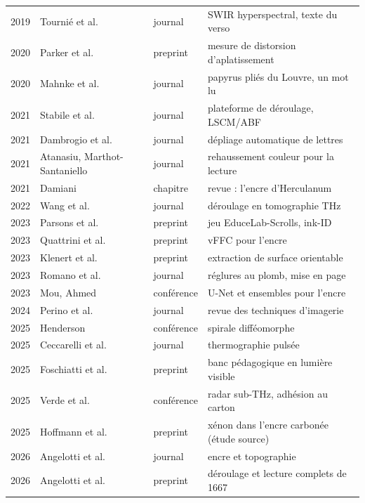 \documentclass[11pt,a4paper]{article}
\begin{document}
\begin{small}
\begin{longtable}{@{}p{1.2cm}p{6.1cm}p{2.3cm}p{5cm}@{}}
2019 & Tournié et al. \cite{tournie2019} & journal & SWIR hyperspectral, texte du verso \\
2020 & Parker et al. \cite{parker2020} & preprint & mesure de distorsion d'aplatissement \\
2020 & Mahnke et al. \cite{mahnke2020} & journal & papyrus pliés du Louvre, un mot lu \\
2021 & Stabile et al. \cite{stabile2021} & journal & plateforme de déroulage, LSCM/ABF \\
2021 & Dambrogio et al. \cite{dambrogio2021} & journal & dépliage automatique de lettres \\
2021 & Atanasiu, Marthot-Santaniello \cite{atanasiu2021} & journal & rehaussement couleur pour la lecture \\
2021 & Damiani \cite{damiani2021} & chapitre & revue : l'encre d'Herculanum \\
2022 & Wang et al. \cite{wang2022thz} & journal & déroulage en tomographie THz \\
2023 & Parsons et al. \cite{parsons2023} & preprint & jeu EduceLab-Scrolls, ink-ID \\
2023 & Quattrini et al. \cite{quattrini2023} & preprint & vFFC pour l'encre \\
2023 & Klenert et al. \cite{klenert2023} & preprint & extraction de surface orientable \\
2023 & Romano et al. \cite{romano2023} & journal & réglures au plomb, mise en page \\
2023 & Mou, Ahmed \cite{mou2023} & conférence & U-Net et ensembles pour l'encre \\
2024 & Perino et al. \cite{perino2024} & journal & revue des techniques d'imagerie \\
2025 & Henderson \cite{henderson2025} & conférence & spirale difféomorphe \\
2025 & Ceccarelli et al. \cite{ceccarelli2025} & journal & thermographie pulsée \\
2025 & Foschiatti et al. \cite{foschiatti2025} & preprint & banc pédagogique en lumière visible \\
2025 & Verde et al. \cite{verde2025} & conférence & radar sub-THz, adhésion au carton \\
2025 & Hoffmann et al. \cite{hoffmann2025} & preprint & xénon dans l'encre carbonée (étude source) \\
2026 & Angelotti et al. \cite{angelotti2026topo} & journal & encre et topographie \\
2026 & Angelotti et al. \cite{angelotti2026complete} & preprint & déroulage et lecture complets de 1667 \\

\end{longtable}
\end{small}
\end{document}
